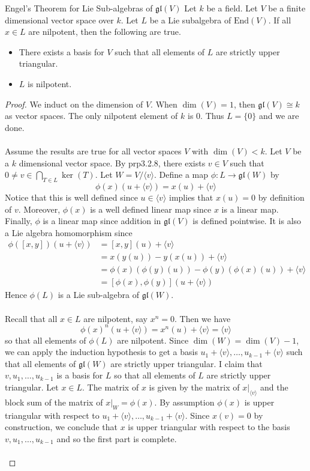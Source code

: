 \documentclass[a4paper]{article}
\begin{document}
\begin{prp}{Engel's Theorem for Lie Sub-algebras of $\mathfrak{gl}(V)$}{} Let $k$ be a field. Let $V$ be a finite dimensional vector space over $k$. Let $L$ be a Lie subalgebra of $\text{End}(V)$. If all $x\in L$ are nilpotent, then the following are true. 
\begin{itemize}
\item There exists a basis for $V$ such that all elements of $L$ are strictly upper triangular. 
\item $L$ is nilpotent. 
\end{itemize} \tcbline
\begin{proof}
We induct on the dimension of $V$. When $\dim(V)=1$, then $\mathfrak{gl}(V)\cong k$ as vector spaces. The only nilpotent element of $k$ is $0$. Thus $L=\{0\}$ and we are done. \\~\\

Assume the results are true for all vector spaces $V$ with $\dim(V)<k$. Let $V$ be a $k$ dimensional vector space. By prp3.2.8, there exists $v\in V$ such that $0\neq v\in\bigcap_{T\in L}\ker(T)$. Let $W=V/\langle v\rangle$. Define a map $\phi:L\to\mathfrak{gl}(W)$ by $$\phi(x)(u+\langle v\rangle)=x(u)+\langle v\rangle$$ Notice that this is well defined since $u\in\langle v\rangle$ implies that $x(u)=0$ by definition of $v$. Moreover, $\phi(x)$ is a well defined linear map since $x$ is a linear map. Finally, $\phi$ is a linear map since addition in $\mathfrak{gl}(V)$ is defined pointwise. It is also a Lie algebra homomorphism since 
\begin{align*}
\phi([x,y])(u+\langle v\rangle)&=[x,y](u)+\langle v\rangle\\
&=x(y(u))-y(x(u))+\langle v\rangle\\
&=\phi(x)(\phi(y)(u))-\phi(y)(\phi(x)(u))+\langle v\rangle\\
&=[\phi(x),\phi(y)](u+\langle v\rangle)
\end{align*}
Hence $\phi(L)$ is a Lie sub-algebra of $\mathfrak{gl}(W)$. \\~\\

Recall that all $x\in L$ are nilpotent, say $x^n=0$. Then we have $$\phi(x)^n(u+\langle v\rangle)=x^n(u)+\langle v\rangle=\langle v\rangle$$ so that all elements of $\phi(L)$ are nilpotent. Since $\dim(W)=\dim(V)-1$, we can apply the induction hypothesis to get a basis $u_1+\langle v\rangle,\dots,u_{k-1}+\langle v\rangle$ such that all elements of $\mathfrak{gl}(W)$ are strictly upper triangular. I claim that $v,u_1,\dots,u_{k-1}$ is a basis for $L$ so that all elements of $L$ are strictly upper triangular. Let $x\in L$. The matrix of $x$ is given by the matrix of $x|_{\langle v\rangle}$ and the block sum of the matrix of $x|_W=\phi(x)$. By assumption $\phi(x)$ is upper triangular with respect to $u_1+\langle v\rangle,\dots,u_{k-1}+\langle v\rangle$. Since $x(v)=0$ by construction, we conclude that $x$ is upper triangular with respect to the basis $v,u_1,\dots,u_{k-1}$ and so the first part is complete. \\~\\


\end{proof}
\end{prp}
\end{document}
